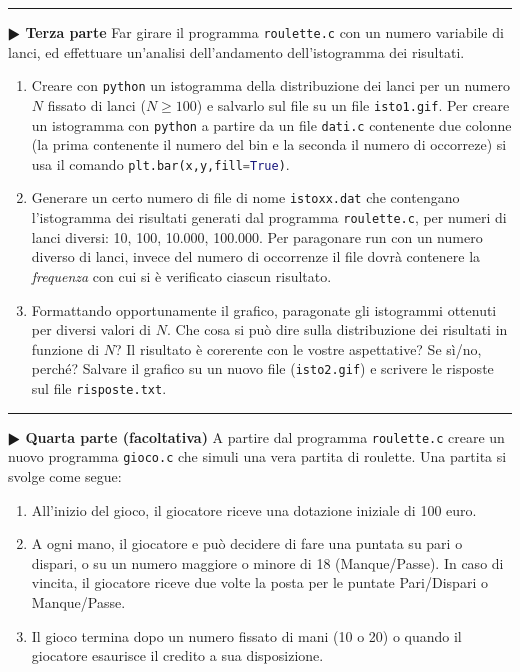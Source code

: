 \documentclass[11pt]{article}
\begin{document}
\hrule
\vspace{2mm}
\textbf{$\RHD$ Terza parte}
Far girare il programma \texttt{roulette.c} con un numero variabile di lanci,
ed effettuare un'analisi dell'andamento dell'istogramma dei risultati.
\begin{enumerate}
\item Creare con \texttt{python} un istogramma della distribuzione dei lanci per un numero $N$ fissato di lanci ($N \ge 100$) e salvarlo sul file su un file \texttt{isto1.gif}.
  Per creare un istogramma con \texttt{python} a partire da un file \texttt{dati.c} contenente due colonne (la prima
  contenente il numero del bin e la seconda il numero di occorreze)
si usa il comando \lstinline[language=Python]!plt.bar(x,y,fill=True)!.
\item Generare un certo numero di file di nome \texttt{istoxx.dat} che contengano l'istogramma dei risultati generati dal programma \texttt{roulette.c}, per numeri di lanci diversi: 10, 100, 10.000, 100.000.
 Per paragonare run con un numero diverso di lanci, invece del numero di occorrenze il file dovr\`a contenere
la {\em frequenza\/} con cui si \`e verificato ciascun risultato.
\item Formattando opportunamente il grafico, paragonate gli istogrammi ottenuti per diversi valori di $N$. Che cosa si
pu\`o dire sulla distribuzione dei risultati in funzione di $N$? Il risultato \`e corerente con le vostre aspettative? Se sì/no, perch\'e? Salvare il grafico su un nuovo file (\texttt{isto2.gif}) e scrivere le risposte sul file \texttt{risposte.txt}.
\end{enumerate}


\hrule
\vspace{2mm}
\textbf{$\RHD$ Quarta parte (facoltativa)}
A partire dal programma \texttt{roulette.c} creare un nuovo programma \texttt{gioco.c} che simuli una vera
partita di roulette.
Una partita si svolge come segue:
\begin{enumerate}
\item All'inizio del gioco, il giocatore riceve una dotazione iniziale di 100 euro.
\item A ogni mano, il giocatore e pu\`o decidere di fare una puntata  su pari o dispari, o su un numero maggiore o minore di 18 (Manque/Passe). In caso di vincita, il giocatore riceve due volte la posta per le puntate Pari/Dispari o Manque/Passe.
\item Il gioco termina dopo un numero fissato di mani (10 o 20) o quando il giocatore esaurisce il credito a sua disposizione.
\end{enumerate}
\end{document}
